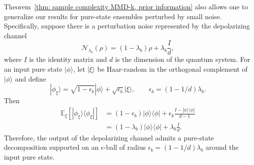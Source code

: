 \documentclass[aps,prx,reprint,superscriptaddress,amsmath,amssymb,longbibliography,floatfix]{revtex4-2}
\providecommand{\ket}[1]{|#1 \rangle}
\providecommand{\ketbra}[2]{|#1\rangle \langle #2|}
\newcommand{\dsE}{\mathbb{E}}
\theoremstyle{plain}
\theoremstyle{definition}
\theoremstyle{remark}
\begin{document}
Theorem~\ref{thm: sample complexity MMD-k, prior information} also allows one to generalize our results for pure-state ensembles perturbed by small noise. Specifically, suppose there is a perturbation noise represented by the depolarizing channel
\begin{equation}
    \mathcal N_{\lambda_b}(\rho) = (1-\lambda_b)\rho+\lambda_b\frac{I}{d},
    \label{eq: depolarizing channel}
\end{equation}
where $I$ is the identity matrix and $d$ is the dimension of the quantum system. For an input pure state $\ket{\phi}$, let $\ket{\xi}$ be Haar-random in the orthogonal complement of $\ket{\phi}$ and define
\begin{equation}
    \ket{\phi_\xi}
    =
    \sqrt{1-\epsilon_b}\ket{\phi}
    +
    \sqrt{\epsilon_b}\ket{\xi},
    \qquad
    \epsilon_b=(1-1/d)\lambda_b .
\end{equation}
Then
\begin{equation}
\begin{aligned}
\dsE_\xi\!\left[\ketbra{\phi_\xi}{\phi_\xi}\right]
    &=
    (1-\epsilon_b)\ketbra{\phi}{\phi}
    +
    \epsilon_b\frac{I-\ketbra{\phi}{\phi}}{d-1}\\
    &=
    (1-\lambda_b)\ketbra{\phi}{\phi}
    +
    \lambda_b\frac{I}{d}.
\end{aligned}
\end{equation}
Therefore, the output of the depolarizing channel admits a pure-state decomposition supported on an $\epsilon$-ball of radius $\epsilon_b=(1-1/d)\lambda_b$ around the input pure state.
\end{document}

